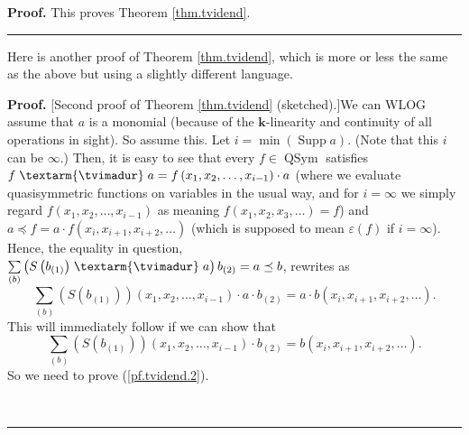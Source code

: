 \documentclass[numbers=enddot,12pt,final,onecolumn,notitlepage,abstracton]{scrartcl}%
\theoremstyle{definition}
\newenvironment{proof}[1][Proof]{\noindent\textbf{#1.} }{\ \rule{0.5em}{0.5em}}
\newenvironment{verlong}{}{}
\newenvironment{noncompile}{}{}
\newcommand{\tvi}{\left. \textarm{\tvimadur} \right.}
\let\sumnonlimits\sum
\renewcommand{\sum}{\sumnonlimits\limits}
\begin{document}
\begin{verlong}
\begin{proof}
This proves Theorem \ref{thm.tvidend}.
\end{proof}

\begin{noncompile}
Here is another proof of Theorem \ref{thm.tvidend}, which is more or less the
same as the above but using a slightly different language.

\begin{proof}
[Second proof of Theorem \ref{thm.tvidend} (sketched).]We can WLOG assume that
$a$ is a monomial (because of the $\mathbf{k}$-linearity and continuity of all
operations in sight). So assume this. Let $i=\min\left(  \operatorname*{Supp}%
a\right)  $. (Note that this $i$ can be $\infty$.) Then, it is easy to see
that every $f\in\operatorname*{QSym}$ satisfies $f\tvi a=f\left(  x_{1}%
,x_{2},\ldots,x_{i-1}\right)  \cdot a$ (where we evaluate quasisymmetric
functions on variables in the usual way, and for $i=\infty$ we simply regard
$f\left(  x_{1},x_{2},\ldots,x_{i-1}\right)  $ as meaning $f\left(
x_{1},x_{2},x_{3},\ldots\right)  =f$) and $a\left.  \preceq\right.  f=a\cdot
f\left(  x_{i},x_{i+1},x_{i+2},\ldots\right)  $ (which is supposed to mean
$\varepsilon\left(  f\right)  $ if $i=\infty$). Hence, the equality in
question, $\sum_{\left(  b\right)  }\left(  S\left(  b_{\left(  1\right)
}\right)  \tvi a\right)  b_{\left(  2\right)  }=a\left.  \preceq\right.  b$,
rewrites as%
\[
\sum_{\left(  b\right)  }\left(  S\left(  b_{\left(  1\right)  }\right)
\right)  \left(  x_{1},x_{2},\ldots,x_{i-1}\right)  \cdot a\cdot b_{\left(
2\right)  }=a\cdot b\left(  x_{i},x_{i+1},x_{i+2},\ldots\right)  .
\]
This will immediately follow if we can show that%
\begin{equation}
\sum_{\left(  b\right)  }\left(  S\left(  b_{\left(  1\right)  }\right)
\right)  \left(  x_{1},x_{2},\ldots,x_{i-1}\right)  \cdot b_{\left(  2\right)
}=b\left(  x_{i},x_{i+1},x_{i+2},\ldots\right)  . \label{pf.tvidend.2}%
\end{equation}
So we need to prove (\ref{pf.tvidend.2}).


\end{proof}
\end{noncompile}
\end{verlong}
\end{document}
